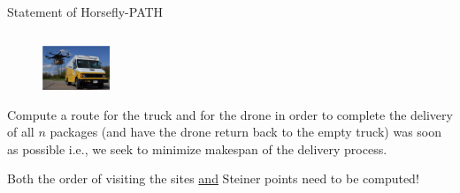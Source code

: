 \documentclass{beamer}
\begin{document}
\begin{frame}{Statement of Horsefly-PATH}
\begin{columns}
    \begin{column}{0.5\textwidth}
      \begin{center}
        
      \begin{figure}
        \includegraphics[width=2.0cm]{slide_imgs/small_truck_and_drone.png}
      \end{figure}
        Compute a route for the truck and for the drone in order to complete the delivery of
        all $n$ packages (and have the drone return back to the empty truck)
        was soon as possible i.e., we seek to {\color{red} minimize  makespan} of the delivery process.

        \vspace{-12pt}
        \begin{framed}
        Both the {\color{red} order} of visiting the sites  
        \underline{and} {\color{red} Steiner points} need to be computed!
        \end{framed}
        
       \end{center}
    \end{column}
    
  \end{columns}
\end{frame}


\end{document}
